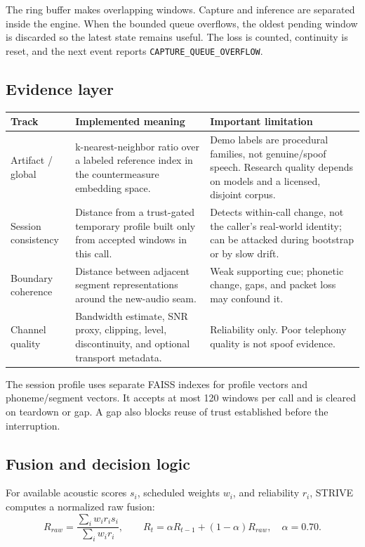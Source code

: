 \documentclass[10pt,a4paper]{article}
\newcommand{\code}[1]{\texttt{\small #1}}
\begin{document}
The ring buffer makes overlapping windows. Capture and inference are separated inside the engine. When the bounded queue overflows, the oldest pending window is discarded so the latest state remains useful. The loss is counted, continuity is reset, and the next event reports \code{CAPTURE\_QUEUE\_OVERFLOW}.

\subsection{Evidence layer}

\begin{tabularx}{\linewidth}{@{}L{35mm}L{38mm}Y@{}}
\toprule
\textbf{Track} & \textbf{Implemented meaning} & \textbf{Important limitation}\\
\midrule
Artifact / global & k-nearest-neighbor ratio over a labeled reference index in the countermeasure embedding space. & Demo labels are procedural families, not genuine/spoof speech. Research quality depends on models and a licensed, disjoint corpus.\\
Session consistency & Distance from a trust-gated temporary profile built only from accepted windows in this call. & Detects within-call change, not the caller's real-world identity; can be attacked during bootstrap or by slow drift.\\
Boundary coherence & Distance between adjacent segment representations around the new-audio seam. & Weak supporting cue; phonetic change, gaps, and packet loss may confound it.\\
Channel quality & Bandwidth estimate, SNR proxy, clipping, level, discontinuity, and optional transport metadata. & Reliability only. Poor telephony quality is not spoof evidence.\\
\bottomrule
\end{tabularx}

The session profile uses separate FAISS indexes for profile vectors and phoneme/segment vectors. It accepts at most 120 windows per call and is cleared on teardown or gap. A gap also blocks reuse of trust established before the interruption.

\subsection{Fusion and decision logic}

For available acoustic scores $s_i$, scheduled weights $w_i$, and reliability $r_i$, STRIVE computes a normalized raw fusion:
\[
R_{raw}=\frac{\sum_i w_i r_i s_i}{\sum_i w_i r_i}, \qquad
R_t=\alpha R_{t-1}+(1-\alpha)R_{raw}, \quad \alpha=0.70.
\]
\end{document}
